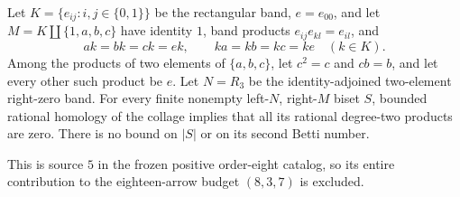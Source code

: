 \begin{theorem}
\label{CP2:A-eight-source-five-right-zero}
Let $K=\{e_{ij}:i,j\in\{0,1\}\}$ be the rectangular band,
$e=e_{00}$, and let $M=K\amalg\{1,a,b,c\}$ have identity $1$,
band products $e_{ij}e_{kl}=e_{il}$, and
\[
 ak=bk=ck=ek,\qquad ka=kb=kc=ke\quad(k\in K).
\]
Among the products of two elements of $\{a,b,c\}$, let
$c^2=c$ and $cb=b$, and let every other such product be $e$.
Let $N=R_3$ be the identity-adjoined two-element right-zero band.
For every finite nonempty left-$N$, right-$M$ biset $S$, bounded
rational homology of the collage implies that all its rational
degree-two products are zero.  There is no bound on $|S|$ or on
its second Betti number.

This is source $5$ in the frozen positive order-eight catalog,
so its entire contribution to the eighteen-arrow budget $(8,3,7)$
is excluded.
\end{theorem}
